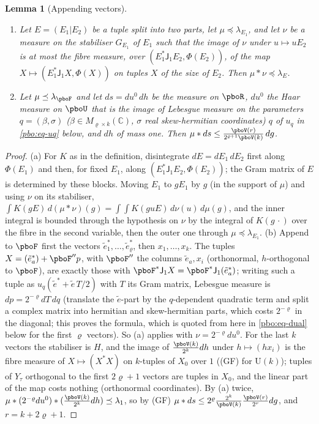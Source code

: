 \documentclass[10pt]{amsart}
\newtheorem{lemma}[theorem]{Lemma}
\theoremstyle{definition}
\theoremstyle{remark}
\newcommand{\C}{\mathbb C}
\begin{document}
\begin{lemma}[Appending vectors]\label{pbo:append}
\begin{enumerate}
\item[(a)] Let $E=(E_1|E_2)$ be a tuple split into two parts, let $\mu\preceq\lambda_{E_1}$, and let
$\nu$ be a measure on the stabiliser $G_{E_1}$ of $E_1$ such that the image of $\nu$ under $u\mapsto
uE_2$ is at most the fibre measure, over $(E_1^*\mathsf J_1E_2,\Phi(E_2))$, of the map $X\mapsto(E_1^*
\mathsf J_1X,\Phi(X))$ on tuples $X$ of the size of $E_2$. Then $\mu*\nu\preceq\lambda_E$.
\item[(b)] Let $\mu\preceq\lambda_{\pboF}$ and let $ds=du^0\,dh$ be the measure on $\pboR$, $du^0$ the
Haar measure on $\pboU$ that is the image of Lebesgue measure on the parameters $q=(\beta,\sigma)$
($\beta\in M_{\varrho\times k}(\C)$, $\sigma$ real skew-hermitian coordinates)  $q$ of
$u_q$ in \eqref{pbo:eq-uq} below, and $dh$ of mass one. Then $\mu*ds\le\frac{\pboV(r)}{2^{\varrho+1}\pboV(k)}\,dg$.
\end{enumerate}
\end{lemma}
\begin{proof}
(a) For $K$ as in the definition, disintegrate $dE=dE_1\,dE_2$ first along $\Phi(E_1)$ and then, for
fixed $E_1$, along $(E_1^*\mathsf J_1E_2,\Phi(E_2))$; the Gram matrix of $E$ is determined by these
blocks. Moving $E_1$ to $gE_1$ by $g$ (in the support of $\mu$) and using $\nu$ on its stabiliser,
$\int K(gE)\,d(\mu*\nu)(g)=\int\int K(guE)\,d\nu(u)\,d\mu(g)$, and the inner integral is bounded through
the hypothesis on $\nu$ by the integral of $K(g\,\cdot)$ over the fibre in the second variable, then
the outer one through $\mu\preceq\lambda_{E_1}$. (b) Append to $\pboF$ first the vectors $\tilde
e^*_1,\dots,\tilde e^*_\varrho$, then $x_1,\dots,x_k$. The tuples $X=(\tilde e^*_a)+\pboF'' p$, with $\pboF''$
the columns $\tilde e_a,x_i$ (orthonormal, $h$-orthogonal to $\pboF$), are exactly those with $\pboF^*
\mathsf J_1X=\pboF^*\mathsf J_1(\tilde e^*_a)$; writing such a tuple as $u_q(\tilde e^*+\tilde e\,T/2)$
with $T$ its Gram matrix, Lebesgue measure is $dp=2^{-\varrho}dT\,dq$ (translate the $\tilde e$-part
by the $q$-dependent quadratic term and split a complex matrix into hermitian and skew-hermitian parts,
which costs $2^{-\varrho}$ in the diagonal; this proves the formula, which is quoted from here in \eqref{pbo:eq-dual} below for the
first $\varrho$ vectors). So (a) applies with $\nu=2^{-\varrho}du^0$. For the last $k$ vectors the stabiliser is $H$,
and the image of $\frac{\pboV(k)}{2^k}dh$ under $h\mapsto(hx_i)$ is the fibre measure of $X\mapsto
(X^*X)$ on $k$-tuples of $X_0$ over $1$ (\textup{(GF)} for $\mathrm U(k)$); tuples of $Y_\tau$
orthogonal to the first $2\varrho+1$ vectors are tuples in $X_0$, and the linear part of the map costs
nothing (orthonormal coordinates). By (a) twice, $\mu*(2^{-\varrho}du^0)*(\frac{\pboV(k)}{2^k}dh)\preceq
\lambda_1$, so by \textup{(GF)} $\mu*ds\le2^\varrho\frac{2^k}{\pboV(k)}\frac{\pboV(r)}{2^r}dg$, and $r=k+
2\varrho+1$.
\end{proof}
\end{document}
